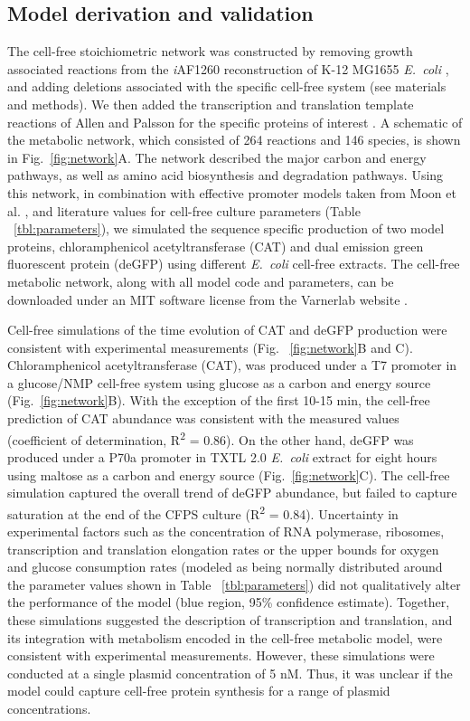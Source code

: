 \documentclass[journal=asbcd6,manuscript=article]{achemso}
\begin{document}
\subsection{Model derivation and validation}
The cell-free stoichiometric network was constructed by removing growth associated reactions from the \textit{i}AF1260 reconstruction of K-12 MG1655 \textit{E.~coli} \cite{Feist:2007aa},
and adding deletions associated with the specific cell-free system (see materials and methods).
We then added the transcription and translation template reactions of Allen and Palsson for the specific proteins of interest \cite{Allen:2003aa}.
A schematic of the metabolic network, which consisted of 264 reactions and 146 species, is shown in Fig.~\ref{fig:network}A.
The network described the major carbon and energy pathways, as well as amino acid biosynthesis and degradation pathways.
Using this network, in combination with effective promoter models taken from Moon et al. \cite{Moon:2012ab}, and literature values for cell-free culture parameters (Table ~\ref{tbl:parameters}),
we simulated the sequence specific production of two model proteins, chloramphenicol acetyltransferase (CAT) and dual emission green fluorescent protein (deGFP) using
different \textit{E.~coli} cell-free extracts.
The cell-free metabolic network, along with all model code and parameters, can be downloaded under an MIT software license from the Varnerlab website \cite{varnerlab}.

Cell-free simulations of the time evolution of CAT and deGFP production were consistent with experimental measurements (Fig. ~\ref{fig:network}B and C).
Chloramphenicol acetyltransferase (CAT), was produced under a T7 promoter in a glucose/NMP cell-free system \cite{2005_calhoun_BiotechnologyProgress}
using glucose as a carbon and energy source (Fig.~\ref{fig:network}B).
With the exception of the first 10-15 min, the cell-free prediction of CAT abundance was consistent with the measured values (coefficient of determination, R\textsuperscript{2} = 0.86).
On the other hand, deGFP was produced under a P70a promoter in TXTL 2.0 \textit{E.~coli} extract for eight hours using maltose as a carbon and energy source (Fig.~\ref{fig:network}C).
The cell-free simulation captured the overall trend of deGFP abundance, but failed to capture saturation at the end of the CFPS culture (R\textsuperscript{2} = 0.84).
Uncertainty in experimental factors such as the concentration of RNA polymerase, ribosomes,
transcription and translation elongation rates or the upper bounds for oxygen and glucose consumption rates (modeled as being normally distributed around the parameter values shown in Table ~\ref{tbl:parameters})
did not qualitatively alter the performance of the model (blue region, 95\% confidence estimate).
Together, these simulations suggested the description of transcription and translation, and its integration with metabolism encoded in the cell-free metabolic model, were consistent with experimental measurements.
However, these simulations were conducted at a single plasmid concentration of 5 nM.
Thus, it was unclear if the model could capture cell-free protein synthesis for a range of plasmid concentrations.
\end{document}
